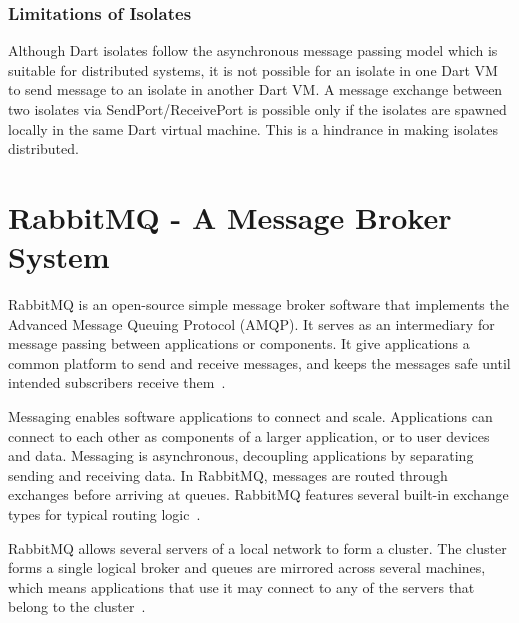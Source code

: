   \subsubsection{Limitations of Isolates}
  Although Dart isolates follow the asynchronous message passing model which is suitable for distributed systems, it is not possible for an isolate in one Dart VM to send message to an isolate in another Dart VM. A message exchange between two isolates via SendPort/ReceivePort is possible only if the isolates are spawned locally in the same Dart virtual machine. This is a hindrance in making isolates distributed.

\section{RabbitMQ - A Message Broker System}
\label{sec:rabbitmq}
  RabbitMQ is an open-source simple message broker software that implements the Advanced Message Queuing Protocol (AMQP). It serves as an intermediary for message passing between applications or components. It give applications a common platform to send and receive messages, and keeps the messages safe until intended subscribers receive them~\cite{rabbitmqFeatures}.

  Messaging enables software applications to connect and scale. Applications can connect to each other as components of a larger application, or to user devices and data. Messaging is asynchronous, decoupling applications by separating sending and receiving data. In RabbitMQ, messages are routed through exchanges before arriving at queues. RabbitMQ features several built-in exchange types for typical routing logic~\cite{rabbitmqFeatures}.

  RabbitMQ allows several servers of a local network to form a cluster. The cluster forms a single logical broker and queues are mirrored across several machines, which means applications that use it may connect to any of the servers that belong to the cluster~\cite{rabbitmqFeatures}.


